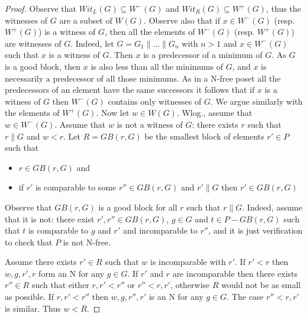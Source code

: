 \documentclass{CSML}
\begin{document}
\begin{proof}
  Observe that $Wit_L(G)\subseteq W^-(G)$ and $Wit_R(G)\subseteq W^+(G)$, thus the witnesses of $G$ are a subset of $W(G)$.
  Observe also that if $x\in W^-(G)$ (resp. $W^+(G)$) is a witness of $G$, then all the elements of $W^-(G)$ (resp. $W^+(G)$) are witnesses of $G$. Indeed, let $G=G_1\parallel\dots\parallel G_n$ with $n>1$ and $x\in W^-(G)$ such that $x$ is a witness of $G$. Then $x$ is a predecessor of a minimum of $G$. As $G$ is a good block, then $x$ is also less than all the minimums of $G$, and $x$ is necessarily a predecessor of all those minimums. As in a N-free poset all the predecessors of an element have the same successors it follows that if $x$ is a witness of $G$ then $W^-(G)$ contains only witnesses of $G$. We argue similarly with the elements of $W^+(G)$.
  Now let $w\in W(G)$.
  Wlog., assume that $w\in W^-(G)$. 
  Assume that $w$ is not a witness of $G$: there exists $r$ such that $r\parallel G$ and $w<r$. Let $R=GB(r,G)$ be the smallest block of elements $r'\in P$ such that 
\begin{itemize}
\item $r\in GB(r,G)$ and
\item if $r'$ is comparable to some $r''\in GB(r,G)$ and $r'\parallel G$ then  $r'\in GB(r,G)$
\end{itemize}
Observe that $GB(r,G)$ is a good block for all $r$ such that $r\parallel G$. Indeed, assume that it is not: there exist $r',r''\in GB(r,G)$, $g\in G$ and $t\in P-GB(r,G)$ such that $t$ is comparable to $g$ and $r'$ and incomparable to $r''$, and it is just verification to check that $P$ is not N-free.

Assume there exists $r'\in R$ such that $w$ is incomparable with $r'$. If $r'<r$ then $w,g,r',r$ form an N for any $g\in G$. If $r'$ and $r$ are incomparable then there exists $r''\in R$ such that either $r,r'<r''$ or $r''<r,r'$, otherwise $R$ would not be as small as possible. If  $r,r'<r''$ then $w,g,r'',r'$ is an N for any $g\in G$. The case $r''<r,r'$ is similar. Thus $w<R$.


\end{proof}
\end{document}
